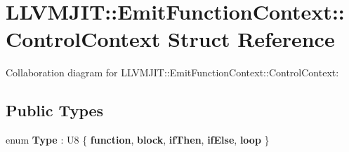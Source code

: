 \hypertarget{struct_l_l_v_m_j_i_t_1_1_emit_function_context_1_1_control_context}{}\section{L\+L\+V\+M\+J\+IT\+:\+:Emit\+Function\+Context\+:\+:Control\+Context Struct Reference}
\label{struct_l_l_v_m_j_i_t_1_1_emit_function_context_1_1_control_context}


Collaboration diagram for L\+L\+V\+M\+J\+IT\+:\+:Emit\+Function\+Context\+:\+:Control\+Context\+:
\subsection*{Public Types}
\begin{DoxyCompactItemize}
\item 
\mbox{\label{struct_l_l_v_m_j_i_t_1_1_emit_function_context_1_1_control_context_a18f87c6583cd53ed484cd00ae1b2348a}} 
enum {\bfseries Type} \+: U8 \{ \newline
{\bfseries function}, 
{\bfseries block}, 
{\bfseries if\+Then}, 
{\bfseries if\+Else}, 
\newline
{\bfseries loop}
 \}
\end{DoxyCompactItemize}
